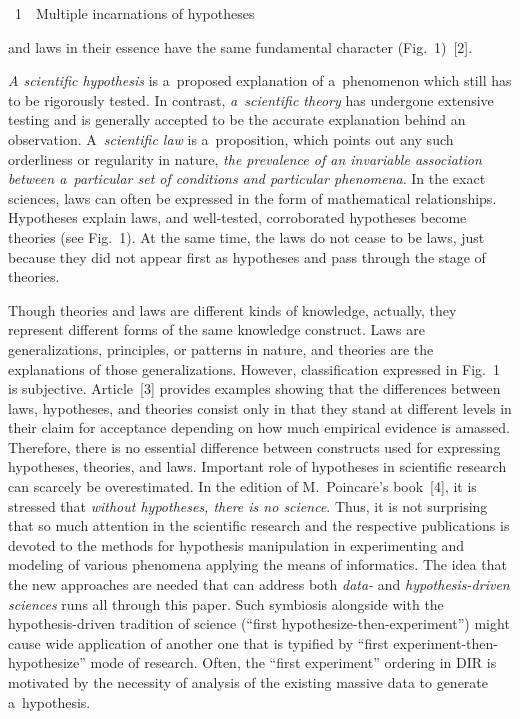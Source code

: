 \begin{multicols}{2}
\begin{center}
\noindent
{{\figurename~1}\ \ \small{Multiple incarnations of hypotheses}}

\end{center}


\vspace*{6pt}


\noindent
 and laws in their essence have the same fundamental character (Fig.~1)~[2].


  \textit{A scientific hypothesis} is a~proposed explanation of a~phenomenon which
still has to be rigorously tested. In contrast, \textit{a~scientific theory} has undergone
extensive testing and is generally accepted to be the accurate explanation behind an
observation. A~\textit{scientific law} is a~proposition, which points out any such
orderliness or regularity in nature, \textit{the prevalence of an invariable association
between a~particular set of conditions and particular phenomena}. In the exact
sciences, laws can often be expressed in the form of mathematical relationships.
Hypotheses explain laws, and well-tested, corroborated hypotheses become theories
(see Fig.~1). At the same time, the laws do not cease to be laws, just because they did not
appear first as hypotheses and pass through the stage of theories.

  Though theories and laws are different kinds of knowledge, actually, they represent
different forms of the same knowledge construct. Laws are generalizations, principles,
or patterns in nature, and theories are the explanations of those generalizations.
However, classification expressed in Fig.~1 is subjective. Article~[3]
provides examples
showing that the differences between laws, hypotheses, and theories consist only in
that they stand at different levels in their claim for acceptance  depending on how
much empirical evidence is amassed. Therefore, there is no essential difference
between constructs used for expressing hypotheses, theories, and laws. Important role
of hypotheses in scientific research can scarcely be
 overestimated. In the edition of
M.~Poincar$\acute{\mbox{e}}$'s book~[4],
 it is stressed that \textit{without
hypotheses, there is no science}. Thus, it is not surprising that so much attention in the
scientific research and the respective publications is devoted to the methods for
hypothesis manipulation in experimenting and modeling of various phenomena
applying the means of informatics. The idea that the new approaches are needed that
can address both \textit{data-} and \textit{hypothesis-driven sciences} runs all through
this paper.  Such symbiosis alongside with the hypothesis-driven tradition of science
(``first hypothesize-then-experiment'') might cause wide application of another one
that is typified by ``first experiment-then-hypothesize'' mode of research. Often, the
``first experiment'' ordering in DIR is motivated by the necessity of analysis of the
existing massive data to generate a~hypothesis.




\end{multicols}
